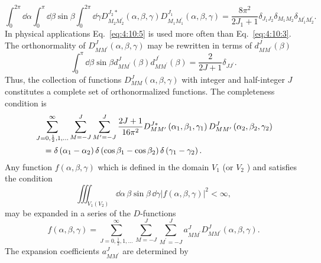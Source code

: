\begin{equation}
\int_{0}^{2 \pi} \dd \alpha \int_{0}^{\pi} \dd \beta \sin \beta \int_{0}^{2 \pi} \dd \gamma D_{M_{2} M_{2}^{\prime}}^{J_{2} *}(\alpha, \beta, \gamma) D_{M_{1} M_{1}^{\prime}}^{J_{1}}(\alpha, \beta, \gamma)=\frac{8 \pi^{2}}{2 J_{1}+1} \delta_{J_{1} J_{2}} \delta_{M_{1} M_{2}} \delta_{M_{1}^{\prime} M_{2}^{\prime}} .\label{eq:4:10:5}
\end{equation}
In physical applications Eq.~\eqref{eq:4:10:5} is used more often than Eq.~\eqref{eq:4:10:3}.\\
The orthonormality of $D_{M M^{\prime}}^{J}(\alpha, \beta, \gamma)$ may be rewritten in terms of $d_{M M^{\prime}}^{J}(\beta)$
\begin{equation}
\int_{0}^{\pi} \dd \beta \sin \beta d_{M M^{\prime}}^{J}(\beta) d_{M M^{\prime}}^{J^{\prime}}(\beta)=\frac{2}{2 J+1} \delta_{J J^{\prime}}. \label{eq:4:10:6}
\end{equation}
Thus, the collection of functions $D_{M M}^{J}(\alpha, \beta, \gamma)$ with integer and half-integer $J$ constitutes a complete set of orthonormalized functions. The completeness condition is
\begin{align}
& \sum_{J=0, \frac{1}{2}, 1, \ldots}^{\infty} \sum_{M=-J}^{J} \sum_{M^{\prime}=-J}^{J} \frac{2 J+1}{16 \pi^{2}} D_{M M^{\prime}}^{J *}\left(\alpha_{1}, \beta_{1}, \gamma_{1}\right) D_{M M^{\prime}}^{J}\left(\alpha_{2}, \beta_{2}, \gamma_{2}\right)  \notag\\
& \quad=\delta\left(\alpha_{1}-\alpha_{2}\right) \delta\left(\cos \beta_{1}-\cos \beta_{2}\right) \delta\left(\gamma_{1}-\gamma_{2}\right) .\label{eq:4:10:7}
\end{align}
Any function $f(\alpha, \beta, \gamma)$ which is defined in the domain $V_{1}$ (or $V_{2}$ ) and satisfies the condition
\begin{equation}
\iiint_{V_{1}\left(V_{2}\right)} \dd \alpha \, \beta \sin \beta\, \dd \gamma|f(\alpha, \beta, \gamma)|^{2}<\infty ,\label{eq:4:10:8}
\end{equation}
may be expanded in a series of the $D$-functions
\begin{equation}
f(\alpha, \beta, \gamma)=\sum_{J=0, \frac{1}{2}, 1, \ldots}^{\infty} \sum_{M=-J}^{J} \sum_{M^{\prime}=-J}^{J} a_{M M^{\prime}}^{J} D_{M M^{\prime}}^{J}(\alpha, \beta, \gamma). \label{eq:4:10:9}
\end{equation}
The expansion coefficients $a_{M M^{\prime}}^{J}$ are determined by

